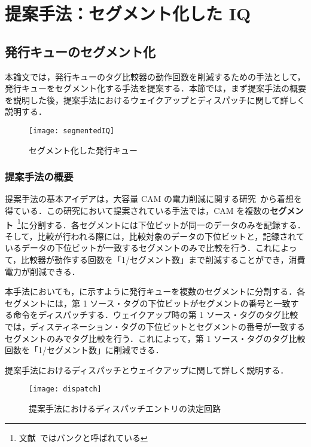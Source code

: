 
\chapter{提案手法：セグメント化した IQ}
\label{sec:segment_IQ}

\section{発行キューのセグメント化}
\label{sec:segmented_IQ}
本論文では，発行キューのタグ比較器の動作回数を削減するための手法として，発行キューをセグメント化する手法を提案する．本節では，まず提案手法の概要を説明した後，提案手法におけるウェイクアップとディスパッチに関して詳しく説明する．

\begin{figure}[htb]
  \centering
  \texttt{[image: segmentedIQ]}
  \caption{セグメント化した発行キュー}
  \label{fig:segmentedIQ}
\end{figure}

\subsection{提案手法の概要}
提案手法の基本アイデアは，大容量 CAM の電力削減に関する研究~\cite{Motomura1990paper,Motomura1990journal}から着想を得ている．この研究において提案されている手法では，CAM を複数の\textbf{セグメント}~\footnote{文献~\cite{Motomura1990paper,Motomura1990journal}ではバンクと呼ばれている}に分割する．各セグメントには下位ビットが同一のデータのみを記録する．そして，比較が行われる際には，比較対象のデータの下位ビットと，記録されているデータの下位ビットが一致するセグメントのみで比較を行う．これによって，比較器が動作する回数を「1/セグメント数」まで削減することができ，消費電力が削減できる．

本手法においても，に示すように発行キューを複数のセグメントに分割する．各セグメントには，第 1 ソース・タグの下位ビットがセグメントの番号と一致する命令をディスパッチする．ウェイクアップ時の第 1 ソース・タグのタグ比較では，ディスティネーション・タグの下位ビットとセグメントの番号が一致するセグメントのみでタグ比較を行う．これによって，第 1 ソース・タグのタグ比較回数を「1/セグメント数」に削減できる．

提案手法におけるディスパッチとウェイクアップに関して詳しく説明する．

\begin{figure}[tb]
  \centering
  \texttt{[image: dispatch]}
  \caption{提案手法におけるディスパッチエントリの決定回路}
  \label{fig:dispatch}
\end{figure}



